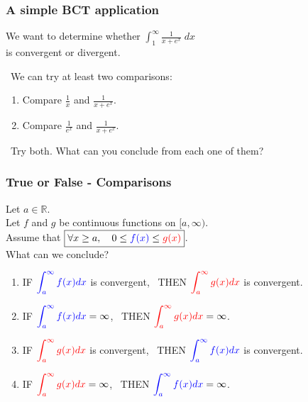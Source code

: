 \documentclass[14pt]{beamer}
\newcommand{\R}{\mathbb{R}}
\newcommand{\azul}[1]{{\color{blue} #1}}
\newcommand{\rojo}[1]{{\color{red} #1}}
\newcommand{\setsize}[1]{\fontsize{#1}{#1}\selectfont} %
\newcommand{\smallerfont}{\setsize{13}} %
\begin{document}
	\begin{frame}[t]
		\smallerfont
		\frametitle{A simple BCT application}

		We want to determine whether
		${\displaystyle \int_1^{\infty} \frac{1}{x+e^{x}} \; dx}$ \\ is convergent
		or divergent.

		\
 We can try at least two comparisons:

		\begin{enumerate}
			\item Compare ${\displaystyle \frac{1}{x}}$ and ${\displaystyle \frac{1}{x+ e^{x}}}$.

			\item Compare ${\displaystyle \frac{1}{e^{x}}}$ and ${\displaystyle \frac{1}{x+ e^{x}}}$.
		\end{enumerate}

		\
 Try both. What can you conclude from each one of them?
	\end{frame}
	\begin{frame}[t]
		\setsize{11}
		\frametitle{True or False - Comparisons}

		Let $a \in \R$. \\ Let $f$ and $g$ be continuous functions on $[a, \infty)$.
		\\ Assume that ${\displaystyle \boxed{\forall x \geq a, \quad 0 \leq \azul{f(x)} \leq \rojo{g(x)}}}$.
		\\ What can we conclude?

		\begin{enumerate}
			\item IF ${\displaystyle \azul{\int_a^{\infty} f(x) dx}}$ is convergent,
				\, THEN ${\displaystyle \rojo{\int_a^{\infty} g(x) dx}}$ is convergent.

			\item IF ${\displaystyle \azul{\int_a^{\infty} f(x) dx} = \infty}$, \,
				THEN ${\displaystyle \rojo{\int_a^{\infty} g(x) dx} = \infty}$.

			\item IF ${\displaystyle \rojo{\int_a^{\infty} g(x) dx}}$ is convergent,
				\, THEN ${\displaystyle \azul{\int_a^{\infty} f(x) dx}}$ is convergent.

			\item IF ${\displaystyle \rojo{\int_a^{\infty} g(x) dx} = \infty}$, \,
				THEN ${\displaystyle \azul{\int_a^{\infty} f(x) dx} = \infty}$.
		\end{enumerate}
	\end{frame}
\end{document}
